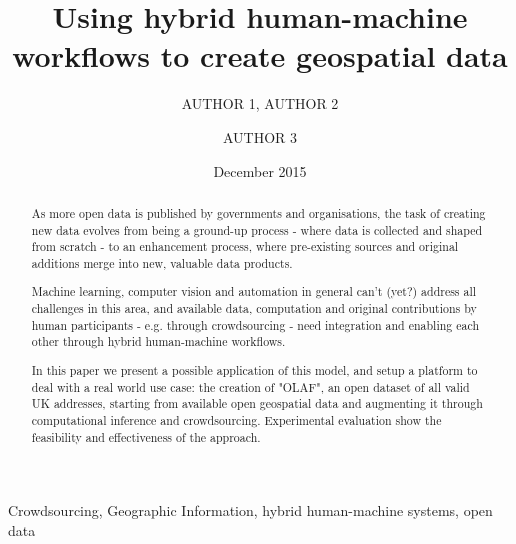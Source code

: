 \documentclass{llncs}
\title{Using hybrid human-machine workflows to create geospatial data}
\author{AUTHOR 1\inst{1}, AUTHOR 2\inst{1} \and AUTHOR 3\inst{2}}
\institute{INSTITUTE 1 \email{EMAIL FOR AUTHOR 1} \and INSTITUTE 2}
\date{December 2015}
\begin{document}
\maketitle

\begin{abstract}
As more open data is published by governments and organisations, the task of creating new data evolves from being a ground-up process - where data is collected and shaped from scratch - to an enhancement process, where pre-existing sources and original additions merge into new, valuable data products. 

Machine learning, computer vision and automation in general can't (yet?) address all challenges in this area, and available data, computation and original contributions by human participants - e.g. through crowdsourcing - need integration and enabling each other through hybrid human-machine workflows. 

In this paper we present a possible application of this model, and setup a platform to deal with a real world use case: the creation of "OLAF", an open dataset of all valid UK addresses, starting from available open geospatial data and augmenting it through computational inference and crowdsourcing. Experimental evaluation show the feasibility and effectiveness of the approach.
\end{abstract}

\begin{keywords}
Crowdsourcing, Geographic Information, hybrid human-machine systems, open data 
\end{keywords}
\end{document}
